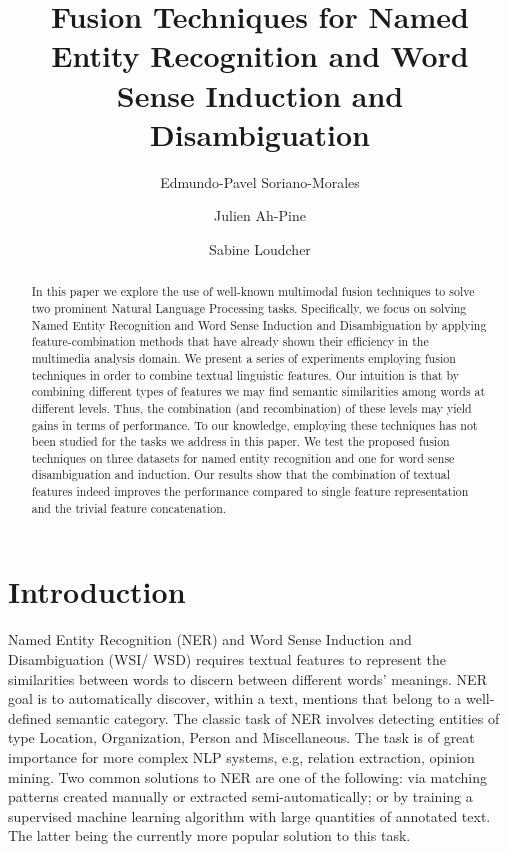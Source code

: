 \documentclass{llncs}
\title{Fusion Techniques for Named Entity Recognition and Word Sense Induction and Disambiguation}
\author{Edmundo-Pavel Soriano-Morales\inst{1} \and Julien Ah-Pine\inst{1}
 \and Sabine Loudcher\inst{1}}
\institute{University of Lyon, Universit\`{e} Lyon 2, Laboratoire ERIC, Lyon, France,\\
\email{\{edmundo.soriano-morales, julien.ah-pine, sabine.loudcher\}@univ-lyon2.fr}}
\date{}
\begin{document}
\maketitle
\begin{abstract}
In this paper we explore the use of well-known multimodal fusion techniques to solve two prominent Natural Language Processing tasks. Specifically, we focus on solving Named Entity Recognition and Word Sense Induction and Disambiguation by applying feature-combination methods that have already shown their efficiency in the multimedia analysis domain. We present a series of experiments employing fusion techniques in order to combine textual linguistic features. Our intuition is that by combining different types of features we may find semantic similarities among words at different levels. Thus, the combination (and recombination) of these levels may yield gains in terms of performance. To our knowledge, employing these techniques has not been studied for the tasks we address in this paper. 
We test the proposed fusion techniques on three datasets for named entity recognition and one for word sense disambiguation and induction. Our results show that the combination of textual features indeed improves the performance compared to single feature representation and the trivial feature concatenation.
\end{abstract}


\section{Introduction}

Named Entity Recognition (NER) and Word Sense Induction and Disambiguation (WSI/ \allowbreak WSD) requires textual features to represent the similarities between words to discern between different words' meanings. NER goal is to automatically discover, within a text, mentions that belong to a well-defined semantic category. The classic task of NER involves detecting entities of type Location, Organization, Person and Miscellaneous. The task is of great importance for more complex NLP systems, e.g, relation extraction, opinion mining. Two common solutions to NER are one of the following: via matching patterns created manually or extracted semi-automatically; or by training a supervised machine learning algorithm with large quantities of annotated text. The latter being the currently more popular solution to this task.




\end{document}
